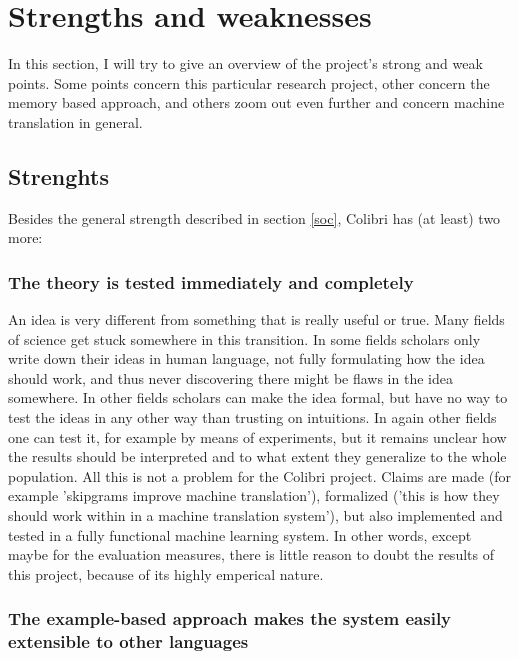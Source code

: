 \documentclass[12pt]{article}
\begin{document}
\section{Strengths and weaknesses}

In this section, I will try to give an overview of the project's strong and weak points. Some points concern this particular research project, other concern the memory based approach, and others zoom out even further and concern machine translation in general.

\subsection{Strenghts}

Besides the general strength described in section \ref{soc}, Colibri has (at least) two more:

\subsubsection{The theory is tested immediately and completely}

An idea is very different from something that is really useful or true. Many fields of science get stuck somewhere in this transition. In some fields scholars only write down their ideas in human language, not fully formulating how the idea should work, and thus never discovering there might be flaws in the idea somewhere. In other fields scholars can make the idea formal, but have no way to test the ideas in any other way than trusting on intuitions. In again other fields one can test it, for example by means of experiments, but it remains unclear how the results should be interpreted and to what extent they generalize to the whole population. All this is not a problem for the Colibri project. Claims are made (for example 'skipgrams improve machine translation'), formalized ('this is how they should work within in a machine translation system'), but also implemented and tested in a fully functional machine learning system. In other words, except maybe for the evaluation measures, there is little reason to doubt the results of this project, because of its highly emperical nature. 

\subsubsection{The example-based approach makes the system easily extensible to other languages}
\end{document}
